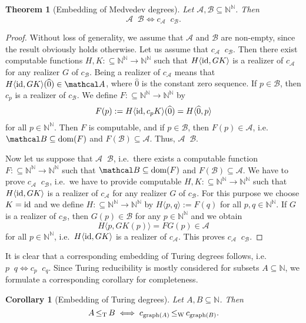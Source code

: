 \documentclass[jsl,10pt]{noasl}
\def\AA{{\mathcal A}}
\def\BB{{\mathcal B}}
\def\IN{{\mathbb{N}}}
\def\In{\subseteq}
\def\id{{\rm id}}
\def\dom{{\rm dom}}
\def\graph{{\rm graph}}
\def\leqT{\mathop{\leq_{\mathrm{T}}}}
\def\leqM{\mathop{\leq_{\mathrm{M}}}}
\def\leqW{\mathop{\leq_{\mathrm{W}}}}
\newtheorem{theorem}[proposition]{Theorem}
\newtheorem{corollary}[proposition]{Corollary}
\begin{document}
\begin{theorem}[Embedding of Medvedev degrees]
\label{thm:Medvedev}
Let $\AA,\BB\In\IN^\IN$. Then
\[\AA\leqM\BB\iff c_\AA\leqW c_\BB.\]
\end{theorem}
\begin{proof}
Without loss of generality, we assume that $\AA$ and $\BB$ are non-empty,
since the result obviously holds otherwise.
Let us assume that $c_\AA\leqW c_\BB$. Then there exist computable
functions $H,K:\In\IN^\IN\to\IN^\IN$ such that 
$H\langle\id,GK\rangle$ is a realizer of $c_\AA$ for any
realizer $G$ of $c_\BB$. Being a realizer of $c_\AA$ means that
$H\langle\id,GK\rangle(\widehat{0})\in\AA$, where $\widehat{0}$ is the constant zero sequence.
If $p\in\BB$, then $c_p$ is a realizer of $c_\BB$. We define $F:\In\IN^\IN\to\IN^\IN$ by
\[F(p):=H\langle\id,c_pK\rangle(\widehat{0})=H\langle\widehat{0},p\rangle\]
for all $p\in\IN^\IN$.
Then $F$ is computable, and if $p\in\BB$, then $F(p)\in\AA$,
i.e.\ $\BB\In\dom(F)$ and $F(\BB)\In\AA$. Thus, $\AA\leqM\BB$.

Now let us suppose that $\AA\leqM\BB$, i.e.\ there exists a computable function
$F:\In\IN^\IN\to\IN^\IN$ such that $\BB\In\dom(F)$ and $F(\BB)\In\AA$.
We have to prove $c_\AA\leqW c_\BB$, i.e.\ we have to provide computable
$H,K:\In\IN^\IN\to\IN^\IN$ such that $H\langle\id,GK\rangle$
is a realizer of $c_\AA$ for any realizer $G$ of $c_\BB$.
For this purpose we choose $K=\id$ and we define $H:\In\IN^\IN\to\IN^\IN$ by
$H\langle p,q\rangle:=F(q)$ for all $p,q\in\IN^\IN$.
If $G$ is a realizer of $c_\BB$, then $G(p)\in\BB$ for any $p\in\IN^\IN$ and we obtain
\[H\langle p,GK(p)\rangle=FG(p)\in\AA\]
for all $p\in\IN^\IN$, i.e.\ $H\langle\id,GK\rangle$ is a realizer of $c_\AA$.
This proves $c_\AA\leqW c_\BB$.
\end{proof}

It is clear that a corresponding embedding of Turing degrees follows,
i.e. $p\leqT q\iff c_p\leqW c_q$. 
Since Turing reducibility is mostly considered
for subsets $A\In\IN$, we formulate a corresponding corollary for completeness.

\begin{corollary}[Embedding of Turing degrees]
\label{cor:Turing}
Let $A,B\In\IN$. Then 
\[A\leqT B\iff c_{\graph(A)}\leqW c_{\graph(B)}.\]
\end{corollary}
\end{document}
